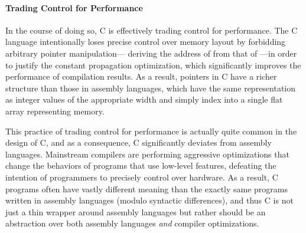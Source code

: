 

\paragraph{Trading Control for Performance}

In the course of doing so, C is effectively trading control for performance.  The C language
intentionally loses precise control over memory layout by forbidding arbitrary pointer
manipulation---\eg{} deriving the address of  from that of ---in order to
justify the constant propagation optimization, which significantly improves the performance of
compilation results.  As a result, pointers in C have a richer structure than those in assembly
languages, which have the same representation as integer values of the appropriate width and simply
index into a single flat array representing memory.

This practice of trading control for performance is actually quite common in the design of C, and as
a consequence, C significantly deviates from assembly languages.  Mainstream compilers are
performing aggressive optimizations that change the behaviors of programs that use low-level
features, defeating the intention of programmers to precisely control over hardware.  As a result, C
programs often have vastly different meaning than the exactly same programs written in assembly
languages (modulo syntactic differences), and thus C is not just a thin wrapper around assembly
languages but rather should be an abstraction over both assembly languages \emph{and} compiler
optimizations.






